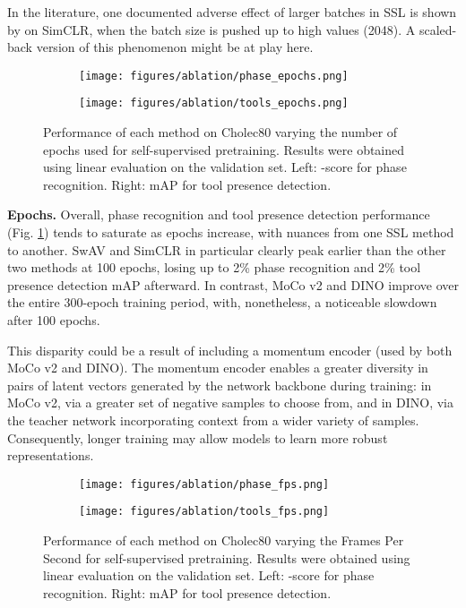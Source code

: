 \documentclass[times,twocolumn,final]{elsarticle}
\begin{document}
In the literature, one documented adverse effect of larger batches in SSL is shown by \cite{chen2020simple} on SimCLR, when the batch size is pushed up to high values (2048). A scaled-back version of this phenomenon might be at play here.
\\
\begin{figure}[h!]
  \begin{subfigure}
    \centering
    \texttt{[image: figures/ablation/phase\_epochs.png]}
  \end{subfigure}
  \begin{subfigure}
    \centering
    \texttt{[image: figures/ablation/tools\_epochs.png]} 
  \end{subfigure}
  \caption{Performance of each method on Cholec80 varying the number of epochs used for self-supervised pretraining. Results were obtained using linear evaluation on the validation set. Left: -score for phase recognition. Right: mAP for tool presence detection.}
  \label{fig:abl_epoch}
\end{figure}

\noindent\textbf{Epochs. } Overall, phase recognition and tool presence detection performance (Fig. \ref{fig:abl_epoch}) tends to saturate as epochs increase, with nuances from one SSL method to another. SwAV and SimCLR in particular clearly peak earlier than the other two methods at 100 epochs, losing up to 2\% phase recognition  and 2\% tool presence detection mAP afterward.
In contrast, MoCo v2 and DINO improve over the entire 300-epoch training period, with, nonetheless, a noticeable slowdown after 100 epochs.

This disparity could be a result of including a momentum encoder (used by both MoCo v2 and DINO). 
The momentum encoder enables a greater diversity in pairs of latent vectors generated by the network backbone during training: in MoCo v2, via a greater set of negative samples to choose from, and in DINO, via the teacher network incorporating context from a wider variety of samples.
Consequently, longer training may allow models to learn more robust representations.
\\
\begin{figure}[h!]
  \begin{subfigure}
    \centering
    \texttt{[image: figures/ablation/phase\_fps.png]}
  \end{subfigure}
  \begin{subfigure}
    \centering
    \texttt{[image: figures/ablation/tools\_fps.png]} 
  \end{subfigure}
  \caption{Performance of each method on Cholec80 varying the Frames Per Second for self-supervised pretraining. Results were obtained using linear evaluation on the validation set. Left: -score for phase recognition. Right: mAP for tool presence detection.}
  \label{fig:abl_fps}
\end{figure}
\end{document}
